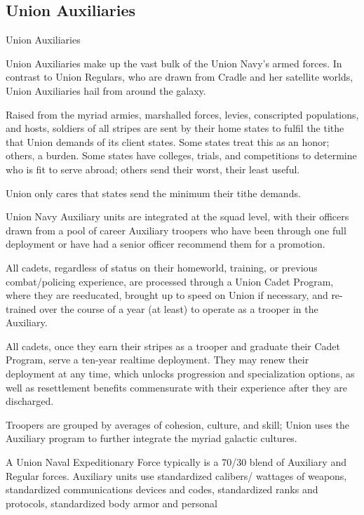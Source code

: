  
\subsection{Union Auxiliaries}
Union Auxiliaries  

Union Auxiliaries make up the vast bulk of the Union Navy’s armed forces. In contrast to Union  
Regulars, who are drawn from Cradle and her satellite worlds, Union Auxiliaries hail from around  
the galaxy.  
 

Raised from the myriad armies, marshalled forces, levies, conscripted populations, and hosts,  
soldiers of all stripes are sent by their home states to fulfil the tithe that Union demands of its  
client states. Some states treat this as an honor; others, a burden. Some states have colleges,  
trials, and competitions to determine who is fit to serve abroad; others send their worst, their  
least useful. 
 

Union only cares that states send the minimum their tithe demands. 
 

Union Navy Auxiliary units are integrated at the squad level, with their officers drawn from a pool  
of career Auxiliary troopers who have been through one full deployment or have had a senior  
officer recommend them for a promotion. 
 

All cadets, regardless of status on their homeworld, training, or previous combat/policing  
experience, are processed through a Union Cadet Program, where they are reeducated, brought  
up to speed on Union if necessary, and re-trained over the course of a year (at least) to operate  
as a trooper in the Auxiliary.
 

All cadets, once they earn their stripes as a trooper and graduate their Cadet Program, serve a  
ten-year realtime deployment. They may renew their deployment at any time, which unlocks  
progression and specialization options, as well as resettlement benefits commensurate with their  
experience after they are discharged. 
 

Troopers are grouped by averages of cohesion, culture, and skill; Union uses the Auxiliary  
program to further integrate the myriad galactic cultures. 
 

A Union Naval Expeditionary Force typically is a 70/30 blend of Auxiliary and Regular forces.  
Auxiliary units use standardized calibers/ wattages of weapons, standardized communications  
devices and codes, standardized ranks and protocols, standardized body armor and personal  

